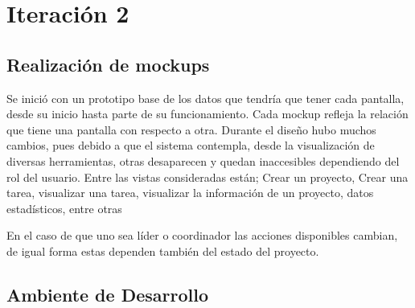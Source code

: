 \section{Iteración 2} 
\subsection{Realización de mockups }
Se inició con un prototipo base de los datos que tendría que tener cada pantalla, desde su inicio hasta parte de su funcionamiento. Cada mockup refleja la relación que tiene una pantalla con respecto a otra. Durante el diseño hubo muchos cambios, pues debido a que el sistema contempla, desde la visualización de diversas herramientas, otras desaparecen y quedan inaccesibles dependiendo del rol del usuario. Entre las vistas consideradas están;  
Crear un proyecto, Crear una tarea, visualizar una tarea, visualizar la información de un proyecto, datos estadísticos, entre otras

En el caso de que uno sea líder o coordinador las acciones disponibles cambian, de igual forma estas dependen también del estado del proyecto. 

\subsection{Ambiente de Desarrollo } 

